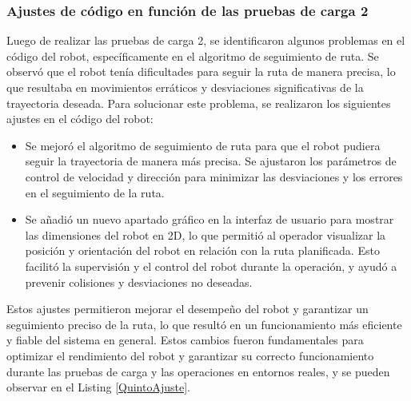 \subsubsection{Ajustes de c\'odigo en funci\'on de las pruebas de carga 2} %
\label{sub:Ajustes de c\'odigo en funci\'on de las pruebas de carga 2}
    Luego de realizar las pruebas de carga 2, se identificaron algunos problemas en el c\'odigo del robot, 
        espec\'ificamente en el algoritmo de seguimiento de ruta. Se observ\'o que el robot ten\'ia dificultades 
        para seguir la ruta de manera precisa, lo que resultaba en movimientos err\'aticos y desviaciones 
        significativas de la trayectoria deseada. Para solucionar este problema, se realizaron los siguientes ajustes 
        en el c\'odigo del robot:
    \vskip 0.5cm
    \begin{itemize}
        \item Se mejor\'o el algoritmo de seguimiento de ruta para que el robot pudiera seguir la trayectoria de manera m\'as precisa. 
            Se ajustaron los par\'ametros de control de velocidad y direcci\'on para minimizar las desviaciones y los errores en el 
            seguimiento de la ruta.
        \item Se a\~nadi\'o un nuevo apartado gr\'afico en la interfaz de usuario para mostrar las dimensiones del robot en 2D, 
            lo que permiti\'o al operador visualizar
            la posici\'on y orientaci\'on del robot en relaci\'on con la ruta planificada. Esto facilit\'o la supervisi\'on y el
            control del robot durante la operaci\'on, y ayud\'o a prevenir colisiones y desviaciones no deseadas.
    \end{itemize}
    \vskip 0.5cm
    Estos ajustes permitieron mejorar el desempe\~no del robot y garantizar un seguimiento preciso de la ruta, 
        lo que result\'o en un funcionamiento m\'as eficiente y fiable del sistema en general. Estos cambios
        fueron fundamentales para optimizar el rendimiento del robot y garantizar su correcto funcionamiento
        durante las pruebas de carga y las operaciones en entornos reales, y se pueden observar en el Listing \ref{QuintoAjuste}.
